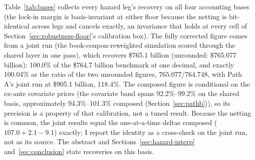 \documentclass[12pt]{article}
\begin{document}
Table~\ref{tab:bases} collects every hazard leg's recovery on all four accounting bases (the lock-in margin is basis-invariant at either floor because the netting is bit-identical across legs and cancels exactly, an invariance that holds at every cell of Section~\ref{sec:robustness-floor}'s calibration box). The fully corrected figure comes from a joint run (the book-coupon-reweighted simulation scored through the shared layer in one pass), which recovers \$765.1 billion (unrounded: \$765.077 billion): 100.0\% of the \$764.7 billion benchmark at one decimal, and exactly 100.04\% as the ratio of the two unrounded figures, $765.077/764.748$, with Path A's joint run at \$905.1 billion, 118.4\%. The composed figure is conditional on the ex-ante covariate priors (the covariate band spans 92.2\%--99.2\% on the shared basis, approximately 94.3\%--101.3\% composed (Section~\ref{sec:pathb})), so its precision is a property of that calibration, not a tuned result. Because the netting is common, the joint results equal the one-at-a-time deltas composed ($107.0 + 2.1 - 9.1$) exactly; I report the identity as a cross-check on the joint run, not as its source. The abstract and Sections~\ref{sec:hazard-interp} and~\ref{sec:conclusion} state recoveries on this basis.
\end{document}
